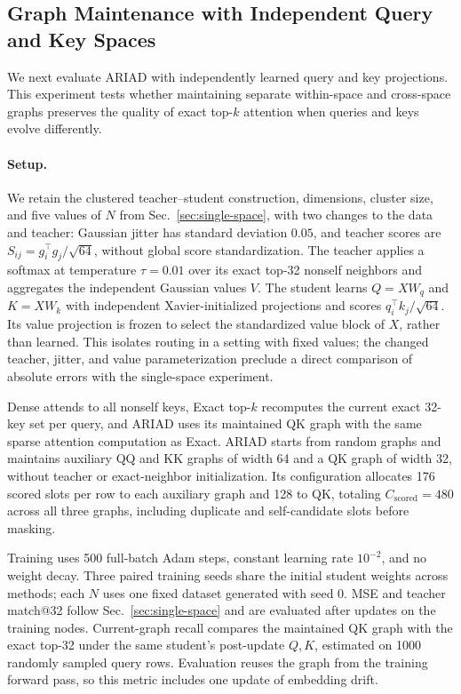 \subsection{Graph Maintenance with Independent Query and Key Spaces}
\label{sec:dual-space}

We next evaluate ARIAD with independently learned query and key projections. This experiment tests whether maintaining separate within-space and cross-space graphs preserves the quality of exact top-$k$ attention when queries and keys evolve differently.

\paragraph{Setup.}
We retain the clustered teacher--student construction, dimensions, cluster size, and five values of $N$ from Sec.~\ref{sec:single-space}, with two changes to the data and teacher: Gaussian jitter has standard deviation $0.05$, and teacher scores are $S_{ij}=g_i^\top g_j/\sqrt{64}$, without global score standardization. The teacher applies a softmax at temperature $\tau=0.01$ over its exact top-32 nonself neighbors and aggregates the independent Gaussian values $V$. The student learns $Q=XW_q$ and $K=XW_k$ with independent Xavier-initialized projections and scores $q_i^\top k_j/\sqrt{64}$. Its value projection is frozen to select the standardized value block of $X$, rather than learned. This isolates routing in a setting with fixed values; the changed teacher, jitter, and value parameterization preclude a direct comparison of absolute errors with the single-space experiment.

Dense attends to all nonself keys, Exact top-$k$ recomputes the current exact 32-key set per query, and ARIAD uses its maintained QK graph with the same sparse attention computation as Exact. ARIAD starts from random graphs and maintains auxiliary QQ and KK graphs of width 64 and a QK graph of width 32, without teacher or exact-neighbor initialization. Its configuration allocates 176 scored slots per row to each auxiliary graph and 128 to QK, totaling $C_{\mathrm{scored}}=480$ across all three graphs, including duplicate and self-candidate slots before masking.

Training uses 500 full-batch Adam steps, constant learning rate $10^{-2}$, and no weight decay. Three paired training seeds share the initial student weights across methods; each $N$ uses one fixed dataset generated with seed 0. MSE and teacher match@32 follow Sec.~\ref{sec:single-space} and are evaluated after updates on the training nodes. Current-graph recall compares the maintained QK graph with the exact top-32 under the same student's post-update $Q,K$, estimated on 1000 randomly sampled query rows. Evaluation reuses the graph from the training forward pass, so this metric includes one update of embedding drift.

